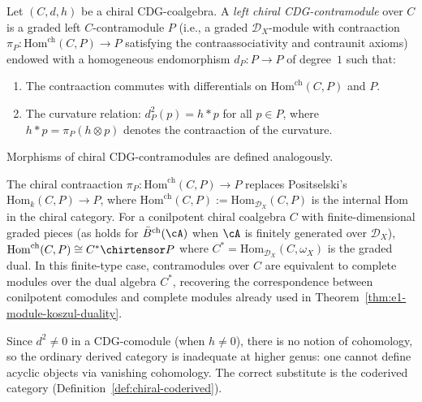 \begin{definition}\label{def:chiral-CDG-contramodule}
Let $(C, d, h)$ be a chiral CDG-coalgebra. A \emph{left chiral
CDG-contramodule} over $C$ is a graded left $C$-contramodule $P$
(i.e., a graded $\mathcal{D}_X$-module with contraaction
$\pi_P\colon \mathrm{Hom}^{\mathrm{ch}}(C, P) \to P$
satisfying the contraassociativity and contraunit axioms)
endowed with a
homogeneous endomorphism $d_P\colon P \to P$ of degree~$1$ such that:
\begin{enumerate}
\item The contraaction commutes with differentials on
 $\mathrm{Hom}^{\mathrm{ch}}(C, P)$ and $P$.
\item The curvature relation:
 $d_P^2(p) = h \ast p$ for all $p \in P$,
 where $h \ast p = \pi_P(h \otimes p)$ denotes the contraaction
 of the curvature.
\end{enumerate}
Morphisms of chiral CDG-contramodules are defined analogously.
\end{definition}

\begin{remark}
\label{rem:chiral-contramodules}
The chiral contraaction $\pi_P\colon \mathrm{Hom}^{\mathrm{ch}}(C, P) \to P$
replaces Positselski's $\mathrm{Hom}_k(C, P) \to P$, where
$\mathrm{Hom}^{\mathrm{ch}}(C, P) := \mathrm{Hom}_{\mathcal{D}_X}(C, P)$
is the internal Hom in the chiral category. For a conilpotent chiral
coalgebra $C$ with finite-dimensional graded pieces (as holds for
$\bar{B}^{\mathrm{ch}}(\cA)$ when $\cA$ is finitely generated over $\mathcal{D}_X$),
$\mathrm{Hom}^{\mathrm{ch}}(C, P) \cong C^* \chirtensor P$
where $C^* = \mathrm{Hom}_{\mathcal{D}_X}(C, \omega_X)$ is the
graded dual. In this finite-type case, contramodules over $C$ are
equivalent to complete modules over the dual algebra $C^*$, recovering
the correspondence between conilpotent comodules and complete modules
already used in Theorem~\ref{thm:e1-module-koszul-duality}.
\end{remark}

\begin{remark}
\label{rem:no-CDG-cohomology}
Since $d^2 \neq 0$ in a CDG-comodule (when $h \neq 0$), there is no
notion of cohomology, so the ordinary
derived category is inadequate at higher genus: one cannot define
acyclic objects via vanishing cohomology. The correct
substitute is the coderived category (Definition~\ref{def:chiral-coderived}).
\end{remark}

